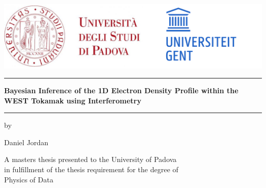 \pagestyle{empty}

\begin{titlepage}
        \begin{center}
        \vspace*{-4.0cm}
        \includegraphics[width = 400 px]{images/unilogos.png}

        \vspace{1cm}
        \hrule %
        \vspace{0.3cm}
        {\Huge \bf Bayesian Inference of the 1D Electron Density Profile within the WEST Tokamak using Interferometry}
        \vspace{0.2cm}
        \hrule %
        
        \vspace*{1.0cm}

        \normalsize
        by \\

        \vspace*{1.0cm}

        \Large
        Daniel Jordan \\

        \vspace*{1.0cm}

        \normalsize
        A masters thesis presented to the University of Padova \\ 
        in fulfillment of the thesis requirement for the degree of \\
        Physics of Data \\

        \vspace*{1.0cm}


\end{center}
\end{titlepage}
